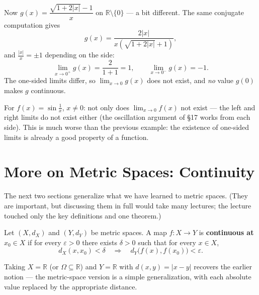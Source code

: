 \documentclass[11pt]{report}
\begin{document}
\begin{exbox}
Now $g(x) = \dfrac{\sqrt{1 + 2|x|} - 1}{x}$ on $\mathbb{R}\setminus\{0\}$ --- a bit different. The same conjugate computation gives
\[
g(x) = \frac{2|x|}{x\left(\sqrt{1+2|x|}+1\right)},
\]
and $\tfrac{|x|}{x} = \pm1$ depending on the side:
\[
\lim_{x\to 0^+} g(x) = \frac{2}{1+1} = 1, \qquad \lim_{x\to0^-} g(x) = -1.
\]
The one-sided limits differ, so $\lim_{x\to0} g(x)$ does not exist, and \emph{no} value $g(0)$ makes $g$ continuous.
\end{exbox}

\begin{rembox}
For $f(x) = \sin\tfrac1x$, $x \neq 0$: not only does $\lim_{x\to0} f(x)$ not exist --- the left and right limits do not exist either (the oscillation argument of \S 17 works from each side). This is much worse than the previous example: the existence of one-sided limits is already a good property of a function.
\end{rembox}


\section{More on Metric Spaces: Continuity}

The next two sections generalize what we have learned to metric spaces. (They are important, but discussing them in full would take many lectures; the lecture touched only the key definitions and one theorem.)

\begin{defbox}
Let $(X, d_X)$ and $(Y, d_Y)$ be metric spaces. A map $f: X \to Y$ is \textbf{continuous at $x_0 \in X$} if for every $\varepsilon > 0$ there exists $\delta > 0$ such that for every $x \in X$,
\[
d_X(x, x_0) < \delta \quad \Longrightarrow \quad d_Y\bigl(f(x), f(x_0)\bigr) < \varepsilon.
\]
\end{defbox}

Taking $X = \mathbb{R}$ (or $\Omega \subseteq \mathbb{R}$) and $Y = \mathbb{R}$ with $d(x,y) = |x-y|$ recovers the earlier notion --- the metric-space version is a simple generalization, with each absolute value replaced by the appropriate distance.
\end{document}
